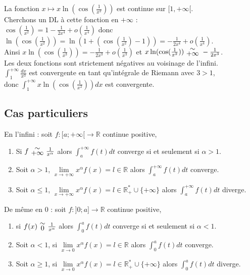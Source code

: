 \documentclass[a4paper,10pt]{book} %
\newcommand{\R}{\mathbb{R}}
\newcommand{\Rpe}{\mathbb{R}_{+}^{*}}
\newcommand{\equi}[1]{\renewcommand{\arraystretch}{0.3}~\begin{matrix}\sim\\#1\end{matrix}~\renewcommand{\arraystretch}{1}}
\newcommand{\displayAmath}{\displaystyle}
\begin{document}
La fonction $x\mapsto x \ln(\cos(\frac{1}{x^2}))$ est continue sur $[1,+\infty[$.\\

Cherchons un DL à cette fonction en $+\infty$ :\\
$\cos(\frac{1}{x^2})=1-\frac{1}{2x^4}+o(\frac{1}{x^4})$ donc $\ln(\cos(\frac{1}{x^2}))=\ln(1+(\cos(\frac{1}{x^2})-1))=-\frac{1}{2x^4}+o(\frac{1}{x^4})$.\\

Ainsi $x\ln(\cos(\frac{1}{x^3}))=-\frac{1}{2x^3}+o(\frac{1}{x^3})$ et $x\ln(\cos(\frac{1}{x^2}))\equi{+\infty}-\frac{1}{2x^3}$.\\

Les deux fonctions sont strictement négatives au voisinage de l'infini.\\

$\displayAmath \int_{1}^{+\infty}\frac{dx}{x^3}$ est convergente en tant qu'intégrale de Riemann avec $3>1$,\\
donc $\displayAmath \int_{1}^{+\infty}x \ln(\cos(\frac{1}{x^2}))dx$ est convergente.

\newpage

\subsection{Cas particuliers}
En l'infini : soit $f:[a;+\infty[\rightarrow \R$ continue positive, 
\begin{enumerate}
\item Si $f\equi{+\infty}\frac{1}{x^\alpha}$ alors $\displayAmath\int_a^{+\infty}f(t)dt$ converge si et seulement si $\alpha>1$.

\item Soit $\alpha>1$, $\lim\limits_{x\rightarrow +\infty}x^\alpha f(x)=l\in\R$ alors $\displaystyle\int_a^{+\infty}f(t)dt$ converge.

\item Soit $\alpha\leq 1$, $\lim\limits_{x\rightarrow +\infty}x^\alpha f(x)=l\in\Rpe\cup\{+\infty\}$ alors $\displayAmath \int_a^{+\infty}f(t)dt$ diverge.
\end{enumerate}

\bigskip

De même en 0 : soit $f:]0;a]\rightarrow \R$ continue positive,
\begin{enumerate}
\item si $f(x)\equi{0}\frac{1}{x^\alpha}$ alors $\displayAmath\int_0^af(t)dt$ converge si et seulement si $\alpha<1$.

\item Soit $\alpha<1$, si $\lim\limits_{x\rightarrow 0}x^\alpha f(x)=l\in\R$ alors $\displayAmath\int_0^af(t)dt$ converge.

\item Soit $\alpha\geq1$, si $\lim\limits_{x\rightarrow 0}x^\alpha f(x)=l\in\Rpe\cup\{+\infty\}$ alors $\displayAmath\int_0^af(t)dt$ diverge.
\end{enumerate}
\end{document}
